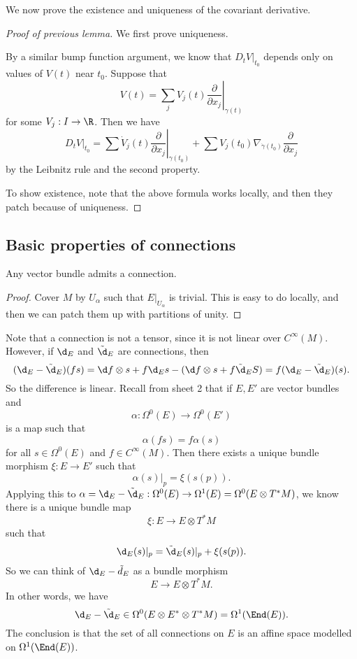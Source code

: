 \documentclass[a4paper]{article}
\begin{document}
We now prove the existence and uniqueness of the covariant derivative.
\begin{proof}[Proof of previous lemma]
  We first prove uniqueness.

  By a similar bump function argument, we know that $D_t V|_{t_0}$ depends only on values of $V(t)$ near $t_0$. Suppose that
  \[
    V(t) = \sum_j V_j(t) \left.\frac{\partial}{\partial x_j}\right|_{\gamma(t)}
  \]
  for some $V_j: I \to \R$. Then we have
  \[
    D_t V|_{t_0} = \sum \dot{V}_j (t) \left.\frac{\partial}{\partial x_j}\right|_{\gamma(t_0)} + \sum V_j(t_0) \nabla_{\dot{\gamma}(t_0)} \frac{\partial}{\partial x_j}
  \]
  by the Leibnitz rule and the second property.

  To show existence, note that the above formula works locally, and then they patch because of uniqueness.
\end{proof}

\subsection{Basic properties of connections}
\begin{prop}
  Any vector bundle admits a connection.
\end{prop}

\begin{proof}
  Cover $M$ by $U_\alpha$ such that $E|_{U_\alpha}$ is trivial. This is easy to do locally, and then we can patch them up with partitions of unity.
\end{proof}

Note that a connection is not a tensor, since it is not linear over $C^\infty(M)$. However, if $\d_E$ and $\tilde{\d}_E$ are connections, then
\[
  (\d_E - \tilde{\d}_E)(fs) = \d f \otimes s + f \d_E s - (\d f \otimes s + f \tilde{\d}_E S) = f (\d_E - \tilde{\d}_E)(s).
\]
So the difference is linear. Recall from sheet 2 that if $E, E'$ are vector bundles and
\[
  \alpha: \Omega^0(E) \to \Omega^0(E')
\]
is a map such that
\[
  \alpha(fs) = f \alpha(s)
\]
for all $s \in \Omega^0(E)$ and $f \in C^\infty(M)$. Then there exists a unique bundle morphism $\xi: E \to E'$ such that
\[
  \alpha(s)|_p = \xi(s(p)).
\]
Applying this to $\alpha = \d_E - \tilde{\d}_E: \Omega^0(E) \to \Omega^1(E) = \Omega^0(E \otimes T^* M)$, we know there is a unique bundle map
\[
  \xi: E \to E \otimes T^* M
\]
such that
\[
  \d_E (s)|_p = \tilde{\d}_E (s) |_p + \xi(s(p)).
\]
So we can think of $\d_E - \tilde{d}_E$ as a bundle morphism
\[
  E \to E \otimes T^*M.
\]
In other words, we have
\[
  \d_E - \tilde{\d}_E \in \Omega^0(E \otimes E^* \otimes T^* M) = \Omega^1(\End(E)).
\]
The conclusion is that the set of all connections on $E$ is an affine space modelled on $\Omega^1(\End(E))$.
\end{document}
